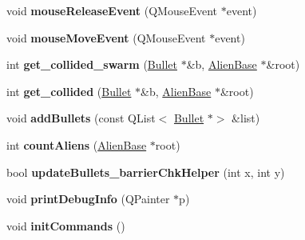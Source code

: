 \begin{DoxyCompactItemize}
\item 
\mbox{\label{classgame_1_1GameDialog_a06136853f0dc047edd202926f5271a43}} 
void {\bfseries mouse\+Release\+Event} (Q\+Mouse\+Event $\ast$event)
\item 
\mbox{\label{classgame_1_1GameDialog_ade016d04db744346e3cc30504d9cb894}} 
void {\bfseries mouse\+Move\+Event} (Q\+Mouse\+Event $\ast$event)
\item 
\mbox{\label{classgame_1_1GameDialog_ad039788978065d933a8c09370fc41f9b}} 
int {\bfseries get\+\_\+collided\+\_\+swarm} (\hyperlink{classgame_1_1Bullet}{Bullet} $\ast$\&b, \hyperlink{classgame_1_1AlienBase}{Alien\+Base} $\ast$\&root)
\item 
\mbox{\label{classgame_1_1GameDialog_a15c0f76f69010da997311d3bacc544db}} 
int {\bfseries get\+\_\+collided} (\hyperlink{classgame_1_1Bullet}{Bullet} $\ast$\&b, \hyperlink{classgame_1_1AlienBase}{Alien\+Base} $\ast$\&root)
\item 
\mbox{\label{classgame_1_1GameDialog_a72ca2411d006615c08bbd97c944fa0e9}} 
void {\bfseries add\+Bullets} (const Q\+List$<$ \hyperlink{classgame_1_1Bullet}{Bullet} $\ast$$>$ \&list)
\item 
\mbox{\label{classgame_1_1GameDialog_ac2e92dcb08b04e2855f407fa29cca007}} 
int {\bfseries count\+Aliens} (\hyperlink{classgame_1_1AlienBase}{Alien\+Base} $\ast$root)
\item 
\mbox{\label{classgame_1_1GameDialog_a3126b48b034cf10866e1c1fd5733bd6d}} 
bool {\bfseries update\+Bullets\+\_\+barrier\+Chk\+Helper} (int x, int y)
\item 
\mbox{\label{classgame_1_1GameDialog_aaf4895fe2e8d09327eb943d0c0ad6fab}} 
void {\bfseries print\+Debug\+Info} (Q\+Painter $\ast$p)
\item 
\mbox{\label{classgame_1_1GameDialog_a845533620762d3ba415bf8a1d227b755}} 
void {\bfseries init\+Commands} ()
\end{DoxyCompactItemize}
